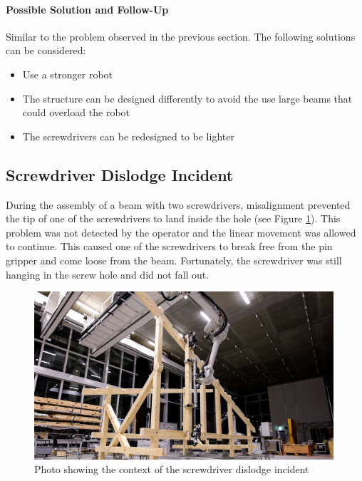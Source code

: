 \paragraph{Possible Solution and Follow-Up}

Similar to the problem observed in the previous section. The following solutions can be considered:

\begin{itemize}[nosep]
    \item Use a stronger robot 
    \item The structure can be designed differently to avoid the use large beams that could overload the robot
    \item The screwdrivers can be redesigned to be lighter
\end{itemize}

\FloatBarrier

\subsection{Screwdriver Dislodge Incident}
\label{subsection:exploration-4-screwdriver-dislodge-incident}

During the assembly of a beam with two screwdrivers, misalignment prevented the tip of one of the screwdrivers to land inside the hole (see Figure \ref{fig:screwdriver-dislodge-incident}). This problem was not detected by the operator and the linear movement was allowed to continue. This caused one of the screwdrivers to break free from the pin gripper and come loose from the beam. Fortunately, the screwdriver was still hanging in the screw hole and did not fall out.

\begin{figure}[!h]
    \centering
    \includegraphics[width=0.99\textwidth]{images/7b/img85.jpg}
    \caption{Photo showing the context of the screwdriver dislodge incident}
    \label{fig:screwdriver-dislodge-incident}
\end{figure}

